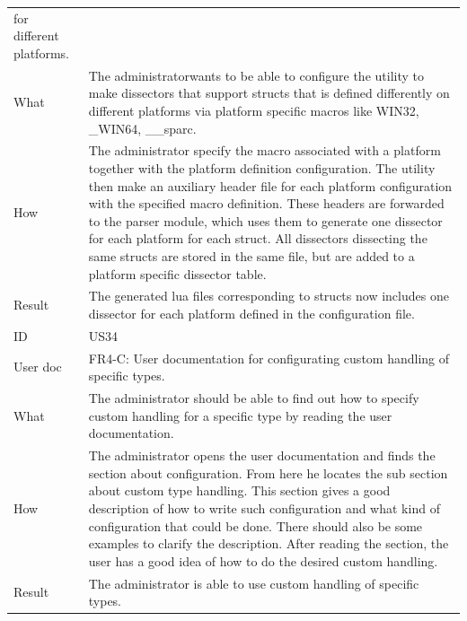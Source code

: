 \begin{table}[htbp]
{\begin{tabularx}{1.2\textwidth}{l X}
	for different platforms. \\
	What & The administratorwants to be able to configure the \gls{utility} to make \glspl{dissector} that support \glspl{struct} that is defined differently on different platforms via platform specific
	macros like WIN32, \_WIN64, \_\_sparc. \\
	How & The administrator specify the macro associated with a platform together with the platform definition configuration. The \gls{utility} then make an auxiliary \gls{header} file for each 
	platform configuration with the specified macro definition. These \glspl{header} are forwarded to the \gls{parser} module, which uses them to generate
  	one \gls{dissector} for each platform for each \gls{struct}. All \glspl{dissector} dissecting the same \glspl{struct} are stored in the same file, but are added to a platform specific \gls{dissector} table. \\
	Result & The generated \Gls{lua} files corresponding to \glspl{struct} now includes one \gls{dissector} for each platform defined in the configuration file. \\
	\midrule
	ID & US34 \\
	User doc & FR4-C: User documentation for configurating custom handling of specific types. \\
	What & The administrator should be able to find out how to specify custom handling for a specific type by reading the user documentation. \\
	How &	 The administrator opens the user documentation and finds the section about configuration. From here he locates the sub section about custom type handling. 
	This section gives a good description of how to write such configuration and what kind of configuration that could be done. There should also be some examples to clarify
	the description. After reading the section, the user has a good idea of how to do the desired custom handling. \\ 
	Result & The administrator is able to use custom handling of specific types. \\
	\midrule

\end{tabularx}}
\end{table}

